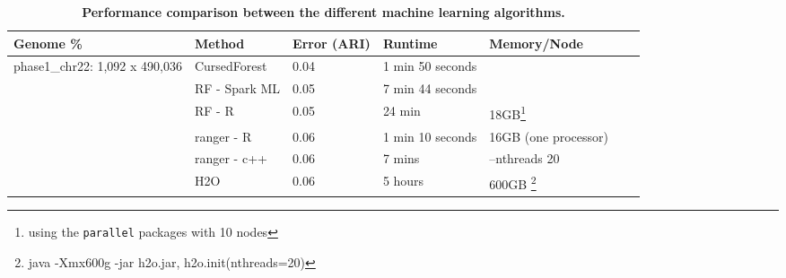 \documentclass[11pt]{article}
\newcommand{\cursedforest}{{\sc CursedForest}}
\begin{document}
\begin{sidewaystable}[!ht]
\begin{minipage}{\textwidth}
\centering
\caption{
{\bf Performance comparison between the different machine learning algorithms.}}
\begin{tabular}{|l|l|l|l|l|l|p{1cm}|}
\hline
\bf{Genome \%}                      & \bf{Method} & \bf{Error (ARI)} & \bf{Runtime} & \bf{Memory/Node} \\
\hline

\multirow{3}{*}{phase1\_chr22: 1,092 x 490,036} & \cursedforest & 0.04  & 1 min 50 seconds  &  \\ %
                                                & RF - Spark ML  &  0.05           &           7 min 44 seconds        &  \\  %
                                                & RF - R         & 0.05       & 24 min           & 18GB\footnote{using the \texttt{parallel} packages with 10 nodes} \\ %
                                                & ranger - R      & 0.06       & 1 min 10 seconds & 16GB  (one processor)                                             \\ %
                                                & ranger - c++     & 0.06       & 7 mins           & --nthreads 20                                                    \\  %
                                                & H2O           & 0.06       & 5 hours         & 600GB \footnote{java -Xmx600g -jar h2o.jar,   h2o.init(nthreads=20)} \\ %


\end{tabular}
\end{minipage}
\end{sidewaystable}
\end{document}
